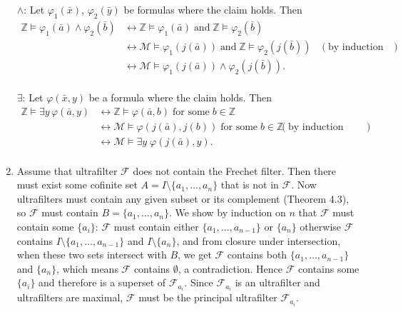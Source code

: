 \documentclass{article}
\begin{document}
\begin{enumerate}
    $\wedge$: Let $\varphi_1(\bar{x})$, $\varphi_2(\bar{y})$ be formulas
    where the claim holds. Then
    \begin{align*}
      \mathbb{Z}\models\varphi_1(\bar{a})\wedge\varphi_2(\bar{b})
        &\leftrightarrow\mathbb{Z}\models\varphi_1(\bar{a})\;\text{and}\;
        \mathbb{Z}\models\varphi_2(\bar{b})& \\
        &\leftrightarrow\mathcal{M}\models\varphi_1(j(\bar{a}))\;\text{and}\;
        \mathbb{Z}\models\varphi_2(j(\bar{b}))& (\text{by induction
        hypothesis}) \\
        &\leftrightarrow\mathcal{M}\models\varphi_1(j(\bar{a}))\wedge\varphi_2(j(\bar{b})). & \\
    \end{align*}

    $\exists$: Let $\varphi(\bar{x},y)$ be a formula where the claim holds.
    Then
    \begin{align*}
      \mathbb{Z}\models\exists y\, \varphi(\bar{a},y)
        &\leftrightarrow\mathbb{Z}\models\varphi(\bar{a},b)\; \text{for
        some}\; b\in\mathbb{Z} & \\
        &\leftrightarrow\mathcal{M}\models\varphi(j(\bar{a}),j(b))\;
        \text{for some}\; b\in\mathbb{Z}& (\text{by induction hypothesis})
        \\
        &\leftrightarrow\mathcal{M}\models\exists y\; \varphi(j(\bar{a}),y). & \\
    \end{align*}

  \item Assume that ultrafilter $\mathcal{F}$ does not contain the Frechet
    filter. Then there must exist some cofinite set
    $A=I\setminus\{a_1,\ldots,a_n\}$ that is not in $\mathcal{F}$. Now
    ultrafilters must contain any given subset or its complement (Theorem
    4.3), so $\mathcal{F}$ must contain $B=\{a_1,\ldots,a_n\}$. We show by
    induction on $n$ that $\mathcal{F}$ must contain some $\{a_i\}$:
    $\mathcal{F}$ must contain either $\{a_1,\ldots,a_{n-1}\}$ or $\{a_n\}$
    otherwise $\mathcal{F}$ contains $I\setminus\{a_1,\ldots,a_{n-1}\}$ and
    $I\setminus\{a_n\}$, and from closure under intersection, when these
    two sets intersect with $B$, we get $\mathcal{F}$ contains both
    $\{a_1,\ldots,a_{n-1}\}$ and $\{a_n\}$, which means $\mathcal{F}$
    contains $\emptyset$, a contradiction. Hence $\mathcal{F}$ contains
    some $\{a_i\}$ and therefore is a superset of $\mathcal{F}_{a_i}$.
    Since $\mathcal{F}_{a_i}$ is an ultrafilter and ultrafilters are
    maximal, $\mathcal{F}$ must be the principal ultrafilter
    $\mathcal{F}_{a_i}$. \\


\end{enumerate}
\end{document}
